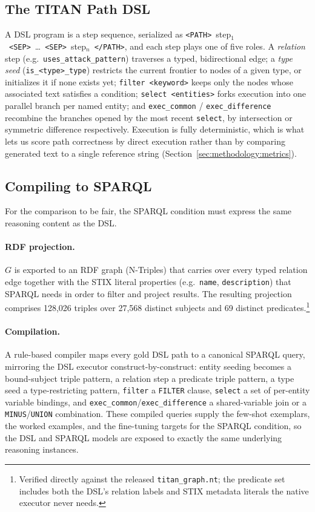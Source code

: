 \subsection{The TITAN Path DSL}
\label{sec:methodology:dsl}

A DSL program is a step sequence, serialized as \texttt{<PATH>}~step$_1$~\texttt{<SEP>}~\ldots~\texttt{<SEP>}~step$_n$~\texttt{</PATH>}, and each step plays one of five roles. A \emph{relation} step (e.g.\ \texttt{uses\_attack\_pattern}) traverses a typed, bidirectional edge; a \emph{type seed} (\texttt{is\_<type>\_type}) restricts the current frontier to nodes of a given type, or initializes it if none exists yet; \texttt{filter~<keyword>} keeps only the nodes whose associated text satisfies a condition; \texttt{select~<entities>} forks execution into one parallel branch per named entity; and \texttt{exec\_common} / \texttt{exec\_difference} recombine the branches opened by the most recent \texttt{select}, by intersection or symmetric difference respectively. Execution is fully deterministic, which is what lets us score path correctness by direct execution rather than by comparing generated text to a single reference string (Section~\ref{sec:methodology:metrics}).

\subsection{Compiling to SPARQL}
\label{sec:methodology:sparql}

For the comparison to be fair, the SPARQL condition must express the same reasoning content as the DSL.

\paragraph{RDF projection.} $G$ is exported to an RDF graph (N-Triples) that carries over every typed relation edge together with the STIX literal properties (e.g.\ \texttt{name}, \texttt{description}) that SPARQL needs in order to filter and project results. The resulting projection comprises 128{,}026 triples over 27{,}568 distinct subjects and 69 distinct predicates.\footnote{Verified directly against the released \texttt{titan\_graph.nt}; the predicate set includes both the DSL's relation labels and STIX metadata literals the native executor never needs.}

\paragraph{Compilation.} A rule-based compiler maps every gold DSL path to a canonical SPARQL query, mirroring the DSL executor construct-by-construct: entity seeding becomes a bound-subject triple pattern, a relation step a predicate triple pattern, a type seed a type-restricting pattern, \texttt{filter} a \texttt{FILTER} clause, \texttt{select} a set of per-entity variable bindings, and \texttt{exec\_common}/\texttt{exec\_difference} a shared-variable join or a \texttt{MINUS}/\texttt{UNION} combination. These compiled queries supply the few-shot exemplars, the worked examples, and the fine-tuning targets for the SPARQL condition, so the DSL and SPARQL models are exposed to exactly the same underlying reasoning instances.

